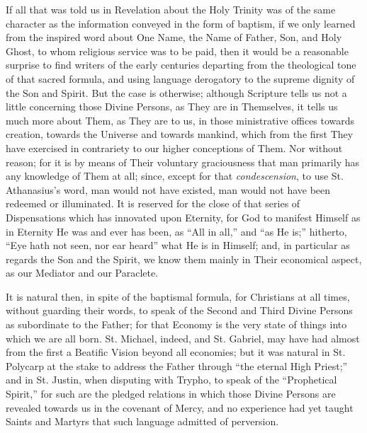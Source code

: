 If all that was told us in Revelation about the Holy Trinity
was of the same character as the information conveyed in the form of
baptism, if we only learned from the inspired word about One Name, the
Name of Father, Son, and Holy Ghost, to whom religious service was to
be paid, then it would be a reasonable surprise to find writers of the
early centuries departing from the theological tone of that sacred
formula, and using language derogatory to the supreme dignity of the
Son and Spirit. But the case is otherwise; although Scripture tells us
not a little concerning those Divine Persons, as They are in
Themselves, it tells us much more about Them, as They are to us, in
those ministrative offices towards creation, towards the Universe and
towards mankind, which from the first They have exercised in
contrariety to our higher conceptions of Them. Nor without reason; for
it is by means of Their voluntary graciousness that man primarily has
any knowledge of Them at all; since, except for that \emph{condescension},
to use St. Athanasius's word, man would not have existed, man would
not have been redeemed or illuminated. It is reserved for the close of
that series of Dispensations which has innovated upon Eternity, for
God to manifest Himself as in Eternity He was and ever has been, as
``All in all,'' and ``as He is;'' hitherto, ``Eye
hath not seen, nor ear heard'' what He is in Himself; and,
in particular as regards the Son and the Spirit, we know them mainly
in Their economical aspect, as our Mediator and our Paraclete.

It is natural then, in spite of the baptismal formula, for
Christians at all times, without guarding their words, to speak of the
Second and Third Divine Persons as subordinate to the Father; for that
Economy is the very state of things into which we are all born. St.
Michael, indeed, and St. Gabriel, may have had almost from the first a
Beatific Vision beyond all economies; but it was natural in St.
Polycarp at the stake to address the Father through ``the eternal
High Priest;'' and in St. Justin, when disputing with Trypho, to
speak of the ``Prophetical Spirit,'' for such are the pledged
relations in which those Divine Persons are revealed towards us in the
covenant of Mercy, and no experience had yet taught Saints and Martyrs
that such language admitted of perversion.

